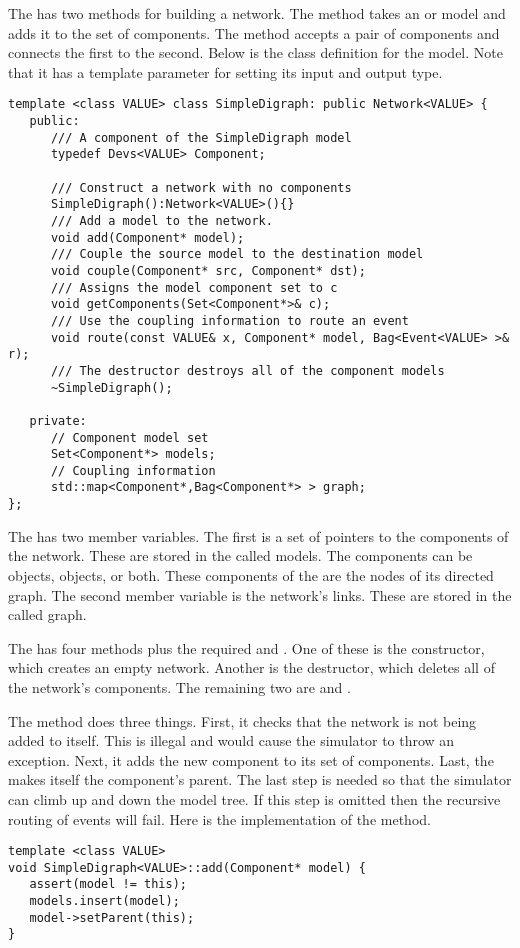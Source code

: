 The  has two methods for building a network. The  method takes an  or  model and adds it to the set of components. The  method accepts a pair of components and connects the first to the second. Below is the class definition for the model. Note that it has a template parameter for setting its input and output type.  
\begin{verbatim}
template <class VALUE> class SimpleDigraph: public Network<VALUE> { 
   public:
      /// A component of the SimpleDigraph model
      typedef Devs<VALUE> Component;

      /// Construct a network with no components
      SimpleDigraph():Network<VALUE>(){}
      /// Add a model to the network.
      void add(Component* model);
      /// Couple the source model to the destination model  
      void couple(Component* src, Component* dst);
      /// Assigns the model component set to c
      void getComponents(Set<Component*>& c);
      /// Use the coupling information to route an event
      void route(const VALUE& x, Component* model, Bag<Event<VALUE> >& r);
      /// The destructor destroys all of the component models
      ~SimpleDigraph();

   private:   
      // Component model set
      Set<Component*> models;
      // Coupling information
      std::map<Component*,Bag<Component*> > graph;
};
\end{verbatim}
The  has two member variables. The first is a set of pointers to the components of the network. These are stored in the  called models. The components can be  objects,  objects, or both. These components of the  are the nodes of its directed graph. The second member variable is the network's links. These are stored in the  called graph.

The  has four methods plus the required  and . One of these is the constructor, which creates an empty network. Another is the destructor, which deletes all of the network's components. The remaining two are  and .

The  method does three things. First, it checks that the network is not being added to itself. This is illegal and would cause the simulator to throw an exception. Next, it adds the new component to its set of components. Last, the  makes itself the component's parent. The last step is needed so that the simulator can climb up and down the model tree. If this step is omitted then the recursive routing of events will fail. Here is the implementation of the  method.
\begin{verbatim}
template <class VALUE> 
void SimpleDigraph<VALUE>::add(Component* model) {
   assert(model != this);
   models.insert(model);
   model->setParent(this);
}
\end{verbatim}

